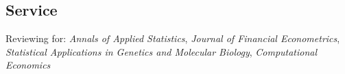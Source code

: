 \documentclass[margin,line]{resume}
\begin{document}
\begin{resume}
      
\vspace{-5mm}
 \section{\mysidestyle Service}
Reviewing for: \textit{Annals of Applied Statistics}, \textit{Journal of Financial Econometrics}, \textit{Statistical Applications in Genetics and Molecular Biology},  \textit{Computational Economics}


\vspace{-2mm}


\end{resume}
\end{document}
